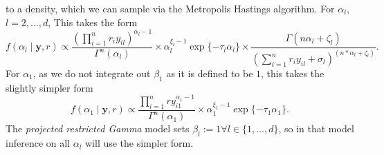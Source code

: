   to a density, which we can sample via the Metropolis Hastings algorithm\citep{hastings1970}.  For $\alpha_l$,
  $l = 2,\ldots, d$, This takes the form
  \begin{equation}
    \label{eqn:alphafc}
    f(\alpha_l \mid \bm{ y}, r) \propto
    \frac{\left({\textstyle \prod}_{i = 1}^nr_iy_{il}\right)^{\alpha_l - 1}}{\Gamma^n(\alpha_l)} \times
    \alpha_l^{\xi_l - 1}\exp\{-\tau_l\alpha_l\} \times
    \frac{\Gamma(n\alpha_l + \zeta_l)}{
        \left({\textstyle\sum}_{i = 1}^n r_iy_{il} + \sigma_l\right)^{(n * \alpha_l + \zeta_l)}}.
  \end{equation}
  For $\alpha_1$, as we do not integrate out $\beta_1$ as it is defined to be $1$, this takes the
  slightly simpler form
  \begin{equation}
    \label{eqn:alphafc1}
    f(\alpha_1 \mid \bm{ y}, r) \propto
      \frac{{\textstyle\prod}_{i = 1}^n ry_{i1}^{\alpha_1 - 1}}{\Gamma^n(\alpha_1)} \times
      \alpha_1^{\xi_1 - 1}\exp\{-\tau_1\alpha_1\}.
  \end{equation}
  The \emph{projected restricted Gamma} model sets $\beta_l := 1 \forall l \in \lbrace 1,\ldots,d\rbrace$,
  so in that model inference on all $\alpha_l$ will use the simpler form.

